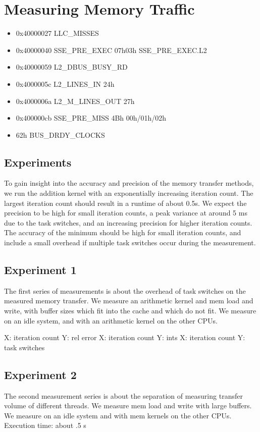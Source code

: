 \documentclass[a4paper,12pt]{article}
\begin{document}
\section{Measuring Memory Traffic}
\begin{itemize}
\item 0x40000027   LLC\_MISSES
\item 0x40000040   SSE\_PRE\_EXEC 07h03h SSE\_PRE\_EXEC.L2
\item 0x40000059   L2\_DBUS\_BUSY\_RD
\item 0x4000005c   L2\_LINES\_IN  24h
\item 0x4000006a   L2\_M\_LINES\_OUT  27h
\item 0x400000cb   SSE\_PRE\_MISS 4Bh 00h/01h/02h
\item 62h BUS\_DRDY\_CLOCKS
\end{itemize}

\subsection{Experiments}
To gain insight into the accuracy and precision of the memory transfer methods,
we run the addition kernel with an exponentially increasing iteration count. The
largest iteration count should result in a runtime of about 0.5s. We expect the
precision to be high for small iteration counts, a peak variance at around 5 ms
due to the task switches, and an increasing precision for higher iteration
counts. The accuracy of the minimum should be high for small iteration counts,
and include a small overhead if multiple task switches occur during the
measurement.

\subsection{Experiment 1}
The first series of measurements is about the overhead of task switches on the
measured memory transfer. We measure an arithmetic kernel and mem load and
write, with buffer sizes which fit into the cache and which do not fit. We
measure on an idle system, and with an arithmetic kernel on the other CPUs.

X: iteration count Y: rel error 
X: iteration count Y: ints
X: iteration count Y: task switches

\subsection{Experiment 2}
The second measurement series is about the separation of measuring transfer
volume of different threads. We measure mem load and write with large buffers.
We measure on an idle system and with mem kernels on the other CPUs. Execution
time: about .5 s
\end{document}
